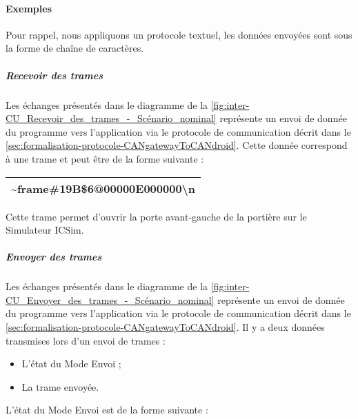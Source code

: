 \paragraph{Exemples}
\label{sec:exemple-CANgatewayToCANdroid}

Pour rappel, nous appliquons un protocole textuel, les données envoyées sont sous la forme de chaîne de caractères.


\subparagraph{Recevoir des trames \newline}

\medspace

Les échanges présentés dans le diagramme de la \autoref{fig:inter-CU_Recevoir_des_trames_-_Scénario_nominal} représente un envoi de donnée du programme {\nomLogiciel} vers l'application {\nomApplication} via le protocole de communication décrit dans le \autoref{sec:formalisation-protocole-CANgatewayToCANdroid}. Cette donnée correspond à une trame et peut être de la forme suivante :\\

\begin{minipage}
    \textwidth
    \centering
    \begin{tabular}{|c|}
        \hline
        \textasciitilde{}frame\#19B\$6@00000E000000\textbackslash n\\
        \hline
    \end{tabular}
\end{minipage}

\medspace

Cette trame permet d'ouvrir la porte avant-gauche de la portière sur le Simulateur ICSim.


\subparagraph{Envoyer des trames \newline}

\medspace

Les échanges présentés dans le diagramme de la \autoref{fig:inter-CU_Envoyer_des_trames_-_Scénario_nominal} représente un envoi de donnée du programme {\nomLogiciel} vers l'application {\nomApplication} via le protocole de communication décrit dans le \autoref{sec:formalisation-protocole-CANgatewayToCANdroid}. Il y a deux données transmises lors d'un envoi de trames :
\begin{itemize}
    \item L'état du Mode Envoi ;
    \item La trame envoyée.
\end{itemize} 
L'état du Mode Envoi est de la forme suivante :\\

